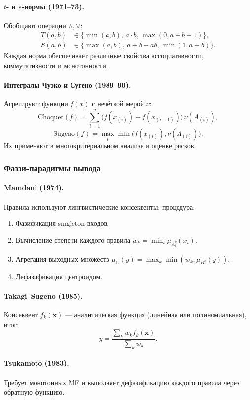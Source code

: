 \paragraph{$t$- и $s$-нормы (1971–73).}  
Обобщают операции $\land,\lor$:
\begin{align}
  T(a,b)&\in\{\min(a,b),\,a\cdot b,\,\max(0,a+b-1)\},\\
  S(a,b)&\in\{\max(a,b),\,a+b-ab,\,\min(1,a+b)\}.
\end{align}
Каждая норма обеспечивает различные свойства ассоциативности, коммутативности и монотонности.

\paragraph{Интегралы Чуэко и Сугено (1989–90).}  
Агрегируют функции $f(x)$ с нечёткой мерой $\nu$:
\[
  \mathrm{Choquet}(f)=\sum_{i=1}^n\bigl(f(x_{(i)})-f(x_{(i-1)})\bigr)\,\nu(A_{(i)}),
\]
\[
  \mathrm{Sugeno}(f)=\max_i\min\bigl(f(x_{(i)}),\nu(A_{(i)})\bigr).
\]
Их применяют в многокритериальном анализе и оценке рисков.

\subsubsection{Фаззи-парадигмы вывода}
\label{subsubsec:inference_expand}

\paragraph{Mamdani (1974).}  
Правила используют лингвистические консеквенты; процедура:
\begin{enumerate}
  \item Фазификация singleton-входов.
  \item Вычисление степени каждого правила $w_k=\min_i\mu_{A^k_i}(x_i)$.
  \item Агрегация выходных множеств $\mu_C(y)=\max_k\min(w_k,\mu_{B^k}(y))$.
  \item Дефазификация центроидом.
\end{enumerate}

\paragraph{Takagi–Sugeno (1985).}  
Консеквент $f_k(\mathbf{x})$ — аналитическая функция (линейная или полиномиальная), итог:
\[
  y=\frac{\sum_k w_k f_k(\mathbf{x})}{\sum_k w_k}.
\]

\paragraph{Tsukamoto (1983).}  
Требует монотонных MF и выполняет дефазификацию каждого правила через обратную функцию.

